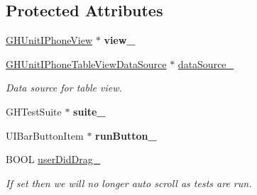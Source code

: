 \subsection*{\-Protected \-Attributes}
\begin{DoxyCompactItemize}
\item 
\hypertarget{interface_g_h_unit_i_phone_view_controller_a9cecc1d6a24df34be94bda57033fa512}{
\hyperlink{interface_g_h_unit_i_phone_view}{\-G\-H\-Unit\-I\-Phone\-View} $\ast$ {\bfseries view\-\_\-}}
\label{interface_g_h_unit_i_phone_view_controller_a9cecc1d6a24df34be94bda57033fa512}

\item 
\hypertarget{interface_g_h_unit_i_phone_view_controller_adeb1b6fe9490dd0f97b65b154d01b82a}{
\hyperlink{interface_g_h_unit_i_phone_table_view_data_source}{\-G\-H\-Unit\-I\-Phone\-Table\-View\-Data\-Source} $\ast$ \hyperlink{interface_g_h_unit_i_phone_view_controller_adeb1b6fe9490dd0f97b65b154d01b82a}{data\-Source\-\_\-}}
\label{interface_g_h_unit_i_phone_view_controller_adeb1b6fe9490dd0f97b65b154d01b82a}

\begin{DoxyCompactList}\small\item\em \-Data source for table view. \end{DoxyCompactList}\item 
\hypertarget{interface_g_h_unit_i_phone_view_controller_a2009d10aa2ab0a34ff85e0409ae6d8c2}{
\-G\-H\-Test\-Suite $\ast$ {\bfseries suite\-\_\-}}
\label{interface_g_h_unit_i_phone_view_controller_a2009d10aa2ab0a34ff85e0409ae6d8c2}

\item 
\hypertarget{interface_g_h_unit_i_phone_view_controller_aaeaf9f437ef082a6b2bdb42c96692623}{
\-U\-I\-Bar\-Button\-Item $\ast$ {\bfseries run\-Button\-\_\-}}
\label{interface_g_h_unit_i_phone_view_controller_aaeaf9f437ef082a6b2bdb42c96692623}

\item 
\hypertarget{interface_g_h_unit_i_phone_view_controller_a105629541140ab10aeed091fcd04176b}{
\-B\-O\-O\-L \hyperlink{interface_g_h_unit_i_phone_view_controller_a105629541140ab10aeed091fcd04176b}{user\-Did\-Drag\-\_\-}}
\label{interface_g_h_unit_i_phone_view_controller_a105629541140ab10aeed091fcd04176b}

\begin{DoxyCompactList}\small\item\em \-If set then we will no longer auto scroll as tests are run. \end{DoxyCompactList}\end{DoxyCompactItemize}
